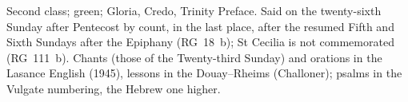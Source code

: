 \vspace{0.1em}
{\footnotesize\noindent Second class; green; Gloria, Credo, Trinity
Preface. Said on the twenty-sixth Sunday after Pentecost by count, in the last
place, after the resumed Fifth and Sixth Sundays after the Epiphany
(RG~18~b); St Cecilia is not commemorated (RG~111~b). Chants (those of the
Twenty-third Sunday) and orations in the Lasance English (1945), lessons in
the Douay--Rheims (Challoner); psalms in the Vulgate numbering, the Hebrew one
higher.\par}
